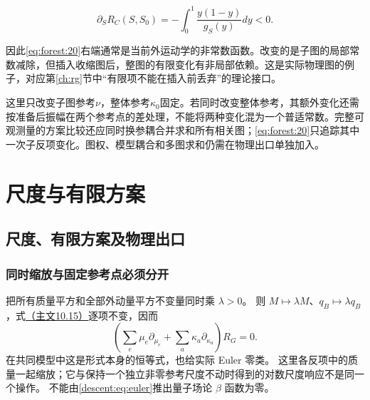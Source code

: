 \documentclass[11pt,a4paper,oneside]{ctexart}
\theoremstyle{cnplain}
\theoremstyle{definition}
\theoremstyle{remark}
\newcommand{\Q}{\mathbb Q}
\newcommand{\im}{\operatorname{im}}
\newcommand{\Res}{\operatorname{Res}}
\newcommand{\dR}{\mathrm{dR}}
\numberwithin{equation}{section}
\newcommand{\otherref}[2]{\href{#1.pdf}{#2}}
\begin{document}
\begin{equation}
\partial_S R_C(S,S_0)
       =-\int_0^1\frac{y(1-y)}{g_S(y)}dy<0.                    \label{eq:forest:26}
\end{equation}

因此\eqref{eq:forest:20}右端通常是当前外运动学的非常数函数。改变的是子图的局部常数减除，但插入收缩图后，整图的有限变化有非局部依赖。这是实际物理图的例子，对应第\ref{ch:rg}节中``有限项不能在插入前丢弃''的理论接口。

这里只改变子图参考\(\nu \)，整体参考\(\kappa _0\)固定。若同时改变整体参考，其额外变化还需按准备后振幅在两个参考点的差处理，不能将两种变化混为一个普适常数。完整可观测量的方案比较还应同时换参耦合并求和所有相关图；\eqref{eq:forest:20}只追踪其中一次子反项变化。图权、模型耦合和多图求和仍需在物理出口单独加入。



\endgroup

\section{尺度与有限方案}\label{supp:descent}

\begingroup
\providecommand{\Q}{\mathbb Q}
\providecommand{\dR}{\mathrm{dR}}
\providecommand{\Res}{\operatorname{Res}}
\providecommand{\im}{\operatorname{im}}
\providecommand{\rk}{\operatorname{rk}}
\providecommand{\cR}{\mathcal R}
\providecommand{\cH}{\mathcal H}
\subsection{尺度、有限方案及物理出口}
\subsubsection{同时缩放与固定参考点必须分开}
把所有质量平方和全部外动量平方不变量同时乘 $\lambda>0$。
则 $M\mapsto\lambda M$、$q_B\mapsto\lambda q_B$，式\otherref{feynman_periods_long_paper}{（主文10.15）}逐项不变，因而
\begin{equation}\label{descent:eq:euler}
 \left(\sum_e\mu_e\partial_{\mu_e}
              +\sum_a\kappa_a\partial_{\kappa_a}\right)R_G=0.
\end{equation}
在共同模型中这是形式本身的恒等式，也给实际 Euler 零类。
这里各反项中的质量一起缩放；它与保持一个独立非零参考尺度不动时得到的对数尺度响应不是同一个操作。
不能由\eqref{descent:eq:euler}推出量子场论 $\beta$ 函数为零。
\end{document}
